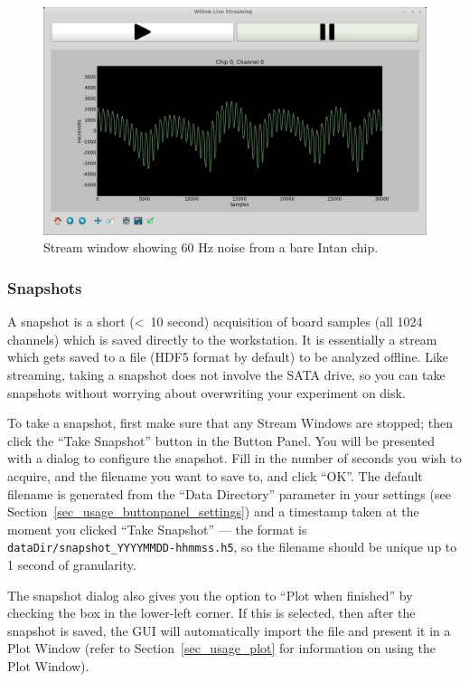 \begin{figure}[h!]
\begin{center}
\includegraphics[width=14cm]{screenshots/streamwindow.png}
\end{center}
\caption{Stream window showing 60 Hz noise from a bare Intan chip.}
\label{fig_streamwindow}
\end{figure}

\subsubsection{Snapshots}
\label{sec_usage_buttonpanel_snapshot}

A snapshot is a short (\textless~10 second) acquisition of board samples (all 1024 channels) which is saved directly to the workstation. It is essentially a stream which gets saved to a file (HDF5 format by default) to be analyzed offline. Like streaming, taking a snapshot does not involve the SATA drive, so you can take snapshots without worrying about overwriting your experiment on disk.

To take a snapshot, first make sure that any Stream Windows are stopped; then click the ``Take Snapshot'' button in the Button Panel. You will be presented with a dialog to configure the snapshot. Fill in the number of seconds you wish to acquire, and the filename you want to save to, and click ``OK''. The default filename is generated from the ``Data Directory'' parameter in your settings (see Section~\ref{sec_usage_buttonpanel_settings}) and a timestamp taken at the moment you clicked ``Take Snapshot'' --- the format is \texttt{dataDir/snapshot\_YYYYMMDD-hhmmss.h5}, so the filename should be unique up to 1 second of granularity.

The snapshot dialog also gives you the option to ``Plot when finished'' by checking the box in the lower-left corner. If this is selected, then after the snapshot is saved, the GUI will automatically import the file and present it in a Plot Window (refer to Section~\ref{sec_usage_plot} for information on using the Plot Window).

